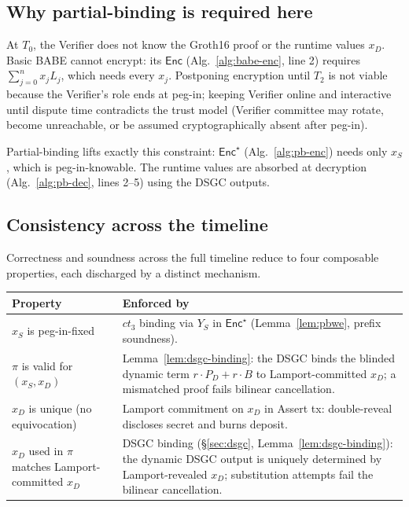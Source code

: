 \documentclass[11pt]{article}
\newcommand{\Enc}{\mathsf{Enc}}
\begin{document}
\subsection{Why partial-binding is required here}

At $T_0$, the Verifier does not know the Groth16 proof or the
runtime values $x_D$. Basic BABE cannot encrypt: its $\Enc$
(Alg.~\ref{alg:babe-enc}, line 2) requires $\sum_{j=0}^{n} x_j L_j$,
which needs every $x_j$. Postponing encryption until $T_2$ is not
viable because the Verifier's role ends at peg-in; keeping Verifier
online and interactive until dispute time contradicts the trust
model (Verifier committee may rotate, become unreachable, or be
assumed cryptographically absent after peg-in).

Partial-binding lifts exactly this constraint: $\Enc^\star$
(Alg.~\ref{alg:pb-enc}) needs only $x_S$, which is peg-in-knowable.
The runtime values are absorbed at decryption
(Alg.~\ref{alg:pb-dec}, lines 2--5) using the DSGC outputs.

\subsection{Consistency across the timeline}

Correctness and soundness across the full timeline reduce to four
composable properties, each discharged by a distinct mechanism.

\begin{center}\small
\renewcommand{\arraystretch}{1.25}
\begin{tabular}{@{}p{3.8cm} p{8cm}@{}}
\toprule
\textbf{Property} & \textbf{Enforced by} \\
\midrule
$x_S$ is peg-in-fixed & $ct_3$ binding via $Y_S$ in $\Enc^\star$
(Lemma~\ref{lem:pbwe}, prefix soundness). \\
$\pi$ is valid for $(x_S, x_D)$ & Lemma~\ref{lem:dsgc-binding}: the
DSGC binds the blinded dynamic term
$r \cdot P_D + r \cdot B$ to Lamport-committed $x_D$; a mismatched
proof fails bilinear cancellation. \\
$x_D$ is unique (no equivocation) & Lamport commitment on $x_D$ in
Assert tx: double-reveal discloses secret and burns deposit. \\
$x_D$ used in $\pi$ matches Lamport-committed $x_D$ &
DSGC binding (\S\ref{sec:dsgc}, Lemma~\ref{lem:dsgc-binding}):
the dynamic DSGC output is uniquely determined by Lamport-revealed
$x_D$; substitution attempts fail the bilinear cancellation. \\
\bottomrule
\end{tabular}
\end{center}
\end{document}
